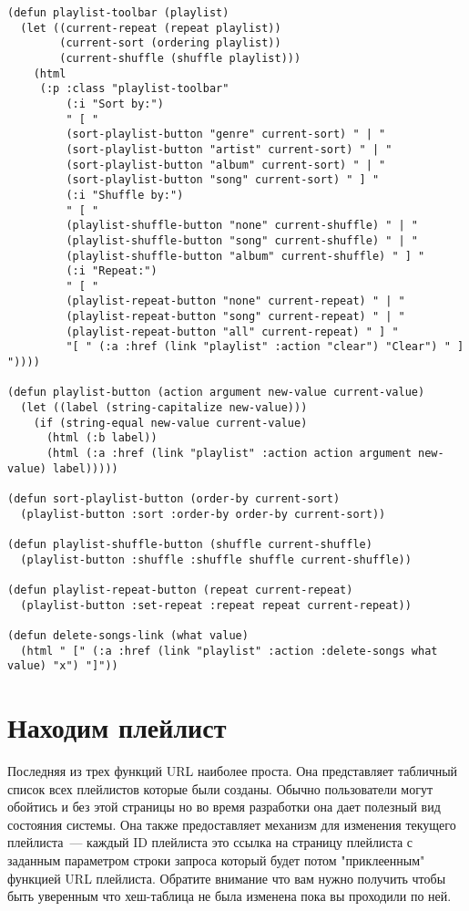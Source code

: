 \begin{lstlisting}
(defun playlist-toolbar (playlist)
  (let ((current-repeat (repeat playlist))
        (current-sort (ordering playlist))
        (current-shuffle (shuffle playlist)))
    (html
     (:p :class "playlist-toolbar"
         (:i "Sort by:")
         " [ "
         (sort-playlist-button "genre" current-sort) " | " 
         (sort-playlist-button "artist" current-sort) " | " 
         (sort-playlist-button "album" current-sort) " | " 
         (sort-playlist-button "song" current-sort) " ] "
         (:i "Shuffle by:")
         " [ "
         (playlist-shuffle-button "none" current-shuffle) " | "
         (playlist-shuffle-button "song" current-shuffle) " | "
         (playlist-shuffle-button "album" current-shuffle) " ] "
         (:i "Repeat:")
         " [ "
         (playlist-repeat-button "none" current-repeat) " | "
         (playlist-repeat-button "song" current-repeat) " | "
         (playlist-repeat-button "all" current-repeat) " ] "
         "[ " (:a :href (link "playlist" :action "clear") "Clear") " ] "))))

(defun playlist-button (action argument new-value current-value)
  (let ((label (string-capitalize new-value)))
    (if (string-equal new-value current-value)
      (html (:b label))
      (html (:a :href (link "playlist" :action action argument new-value) label)))))

(defun sort-playlist-button (order-by current-sort)
  (playlist-button :sort :order-by order-by current-sort))

(defun playlist-shuffle-button (shuffle current-shuffle)
  (playlist-button :shuffle :shuffle shuffle current-shuffle))

(defun playlist-repeat-button (repeat current-repeat)
  (playlist-button :set-repeat :repeat repeat current-repeat))

(defun delete-songs-link (what value)
  (html " [" (:a :href (link "playlist" :action :delete-songs what value) "x") "]"))
\end{lstlisting}

\section{Находим плейлист}

Последняя из трех функций URL наиболее проста. Она представляет табличный список всех
плейлистов которые были созданы. Обычно пользователи могут обойтись и без этой страницы но
во время разработки она дает полезный вид состояния системы. Она также предоставляет
механизм для изменения текущего плейлиста~--- каждый ID плейлиста это ссылка на страницу
плейлиста с заданным параметром строки запроса  который будет потом
"приклеенным" функцией URL плейлиста. Обратите внимание что вам нужно получить
 чтобы быть уверенным что хеш-таблица  не
была изменена пока вы проходили по ней. 

